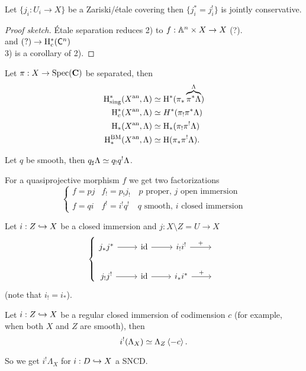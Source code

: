 \begin{exercise}
Let $\{j_i:U_i\to X\} $ be a Zariski/\'etale covering then $\{j_i^{*}=j_i^{!}\} $ is
jointly conservative.
\end{exercise}
\begin{proof}[Proof sketch]
\'Etale separation reduces 2) to $f:\Aff^{n}\times X\to X$ (?).\\
and $(?)\to \CH_c^*(\C^n)$\\
3) is a corollary of 2).
\end{proof}
\begin{proposition}
Let $\pi:X\to \Spec(\bb{C})$ be separated, then
\begin{align*}
\mathrm{H}_{\text{sing}}^{*}(X^\text{an},\Lambda) &\simeq \mathrm{H}^{*}(\pi_*\overbrace{\pi^{*}\Lambda}^{\Lambda}) \\
\mathrm{H}_c^{*}(X^\text{an}, \Lambda) &\simeq H^{*}(\pi_!\pi^{*}\Lambda) \\
\mathrm{H}_*(X^\text{an}, \Lambda) &\simeq \mathrm{H}_*(\pi_!\pi^{!}\Lambda) \\
\mathrm{H}_*^{\text{BM}}(X^\text{an},\Lambda) &\simeq \mathrm{H}(\pi_*\pi^{!}\Lambda).
\end{align*}
\end{proposition}
\begin{remark}
Let $q$ be smooth, then $q_\sharp\Lambda\simeq q_!q^{!}\Lambda$.
\end{remark}
For a quasiprojective morphism $f$ we get two factorizations
\[
\begin{cases}
f = pj & f_! = p_!j_! \quad\text{$p$ proper, $j$ open immersion}\\
f = qi & f^! = i^!q^! \quad\text{$q$ smooth, $i$ closed immersion}
\end{cases}
\]
\begin{proposition}
Let $i:Z\hookrightarrow X$ be a closed immersion and $j:X\setminus Z=U\to X$
\[
\left\{
\begin{tikzcd}
j_{*}j^{*} \ar[r] & \id \ar[r] & i_!i^{!} \ar[r,"+"] & {} \\
j_!j^{!} \ar[r] & \id \ar[r] & i_* i^{*} \ar[r,"+"] & {}
\end{tikzcd}
\right.
\]
(note that $i_! = i_*$).
\end{proposition}
\begin{proposition}
Let $i:Z\hookrightarrow X$ be a regular closed immersion of codimension $c$ (for example, when
both $X$ and $Z$ are smooth), then
\[
i^{!}(\Lambda_X) \simeq \Lambda_Z \left<-c \right>.
\]
\end{proposition}
So we get $i^{!}\Lambda_X$ for $i:D\hookrightarrow X$ a SNCD.

